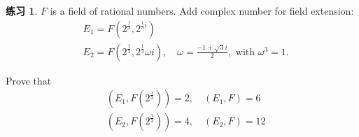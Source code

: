 \documentclass[utf8]{ctexbook}
\theoremstyle{definition}
\newtheorem{exercise}{练习}[section]
\begin{document}
\begin{exercise}
$F$ is a field of rational numbers. Add complex number for field extension:
\begin{align*}
& E_1 = F(2^{\frac{1}{3}}, 2^{\frac{1}{3} i}) \\
& E_2 = F(2^{\frac{1}{3}}, 2^{\frac{1}{3}} \omega i), \quad \omega = \frac{-1 + \sqrt{3} i}{2}, \mbox{ with } \omega^3 = 1 .
\end{align*}

Prove that
\begin{align*}
& (E_1, F(2^{\frac{1}{3}}) ) = 2, \quad (E_1, F) = 6 \\
& (E_2, F(2^{\frac{1}{3}}) ) = 4, \quad (E_2, F) = 12
\end{align*}


\end{exercise}
\end{document}
